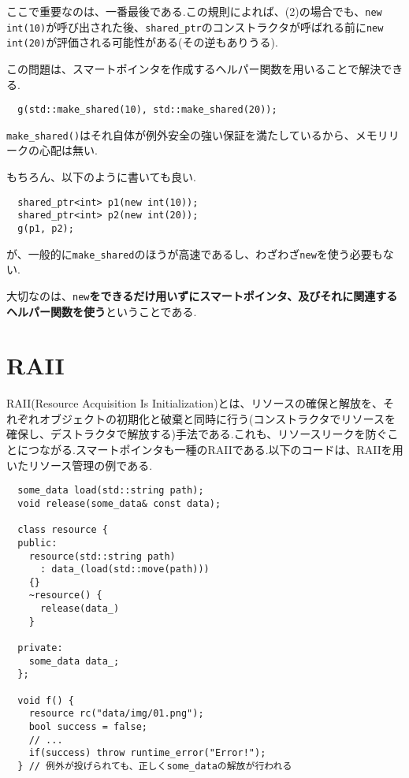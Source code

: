 \documentclass[a4j,11pt,openright]{jsbook}
\begin{document}
ここで重要なのは、一番最後である.この規則によれば、(2)の場合でも、\verb|new int(10)|が呼び出された後、\verb|shared_ptr|のコンストラクタが呼ばれる前に\verb|new int(20)|が評価される可能性がある(その逆もありうる).

この問題は、スマートポインタを作成するヘルパー関数を用いることで解決できる.

\begin{verbatim}
  g(std::make_shared(10), std::make_shared(20));
\end{verbatim}

\verb|make_shared()|はそれ自体が例外安全の強い保証を満たしているから、メモリリークの心配は無い.

もちろん、以下のように書いても良い.

\begin{verbatim}
  shared_ptr<int> p1(new int(10));
  shared_ptr<int> p2(new int(20));
  g(p1, p2);
\end{verbatim}

が、一般的に\verb|make_shared|のほうが高速であるし、わざわざ\verb|new|を使う必要もない.

大切なのは、\verb|new|\textbf{をできるだけ用いずにスマートポインタ、及びそれに関連するヘルパー関数を使う}ということである.

\section{RAII}

RAII(Resource Acquisition Is Initialization)とは、リソースの確保と解放を、それぞれオブジェクトの初期化と破棄と同時に行う(コンストラクタでリソースを確保し、デストラクタで解放する)手法である.これも、リソースリークを防ぐことにつながる.スマートポインタも一種のRAIIである.以下のコードは、RAIIを用いたリソース管理の例である.

\begin{verbatim}
  some_data load(std::string path);
  void release(some_data& const data);

  class resource {
  public:
    resource(std::string path)
      : data_(load(std::move(path)))
    {}
    ~resource() {
      release(data_)
    }

  private:
    some_data data_;
  };

  void f() {
    resource rc("data/img/01.png");
    bool success = false;
    // ...
    if(success) throw runtime_error("Error!");
  } // 例外が投げられても、正しくsome_dataの解放が行われる
\end{verbatim}
\end{document}
